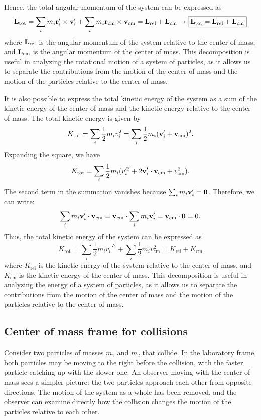 \documentclass[12pt]{article}
\begin{document}
Hence, the total angular momentum of the system can be expressed as
\begin{equation}
    \vb{L}_{\text{tot}} = \sum_i m_i \vb{r}_i' \times \vb{v}_i' + \sum_i m_i \vb{r}_{\text{cm}} \times \vb{v}_{\text{cm}} = \vb{L}_{\text{rel}} + \vb{L}_{\text{cm}} \rightarrow \boxed{\vb{L}_{\text{tot}} = \vb{L}_{\text{rel}} + \vb{L}_{\text{cm}}}
\end{equation}
where $\vb{L}_{\text{rel}}$ is the angular momentum of the system relative to the center of mass, and $\vb{L}_{\text{cm}}$ is the angular momentum of the center of mass. This decomposition is useful in analyzing the rotational motion of a system of particles, as it allows us to separate the contributions from the motion of the center of mass and the motion of the particles relative to the center of mass.

It is also possible to express the total kinetic energy of the system as a sum of the kinetic energy of the center of mass and the kinetic energy relative to the center of mass. The total kinetic energy is given by
\[
    K_{\text{tot}} = \sum_i \frac{1}{2} m_i v_i^2 = \sum_i \frac{1}{2} m_i (\vb{v}_i' + \vb{v}_{\text{cm}})^2.
\]
Expanding the square, we have
\[
    K_{\text{tot}} = \sum_i \frac{1}{2} m_i (v_i'^2 + 2 \vb{v}_i' \cdot \vb{v}_{\text{cm}} + v_{\text{cm}}^2).
\]
The second term in the summation vanishes because $\sum_i m_i \vb{v}_i' = \vb{0}$. Therefore, we can write:
\[
    \sum_i m_i \vb{v}_i' \cdot \vb{v}_{\text{cm}} = \vb{v}_{\text{cm}} \cdot \sum_i m_i \vb{v}_i' = \vb{v}_{\text{cm}} \cdot \vb{0} = 0.
\]
Thus, the total kinetic energy of the system can be expressed as
\begin{equation}
    K_{\text{tot}} = \sum_i \frac{1}{2} m_i v_i'^2 + \sum_i \frac{1}{2} m_i v_{\text{cm}}^2 = K_{\text{rel}} + K_{\text{cm}}
\end{equation}
where $K_{\text{rel}}$ is the kinetic energy of the system relative to the center of mass, and $K_{\text{cm}}$ is the kinetic energy of the center of mass. This decomposition is useful in analyzing the energy of a system of particles, as it allows us to separate the contributions from the motion of the center of mass and the motion of the particles relative to the center of mass.

\subsection{Center of mass frame for collisions}

Consider two particles of masses $m_1$ and $m_2$ that collide. In the laboratory frame, both particles may be moving to the right before the collision, with the faster particle catching up with the slower one. An observer moving with the center of mass sees a simpler picture: the two particles approach each other from opposite directions. The motion of the system as a whole has been removed, and the observer can examine directly how the collision changes the motion of the particles relative to each other.
\end{document}
